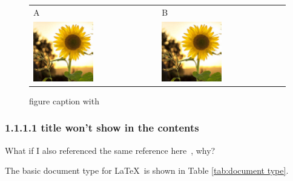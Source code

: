 \documentclass[12pt,openright]{book}
\begin{document}
\begin{figure}[htp]
  \centering
  \begin{tabular}{ll}
    A & B \\
    \includegraphics[width=0.5\textwidth]{29571453}
    & \includegraphics[width=0.5\textwidth]{29571453} \\
  \end{tabular}
  \caption[figure caption with citation.]{figure caption with } 
	\label{fig:figurespanel_table}
\end{figure}

\subsubsection{1.1.1.1 title won't show in the contents}

What if I also referenced the same reference here~\cite{ibge1993}, why?

\noindent The basic document type for \LaTeX\ is shown in Table \ref{tab:document type}.
\end{document}
